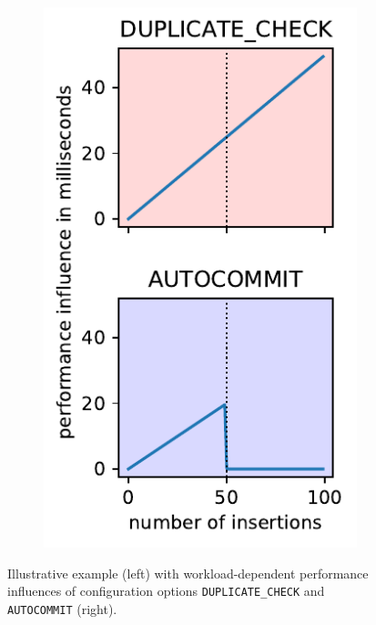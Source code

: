 \begin{figure}
	\begin{subfigure}[l]{0.63\linewidth}
		
	\end{subfigure}
	\hfill
	\begin{subfigure}[l]{0.35\linewidth}
		\includegraphics[width=1\linewidth]{images/influences.pdf}
	\end{subfigure}
	\caption{Illustrative example (left) with workload-dependent performance influences of configuration options \texttt{DUPLICATE\_CHECK} and \texttt{AUTOCOMMIT} (right).}
	\label{fig:intro}
\end{figure}

